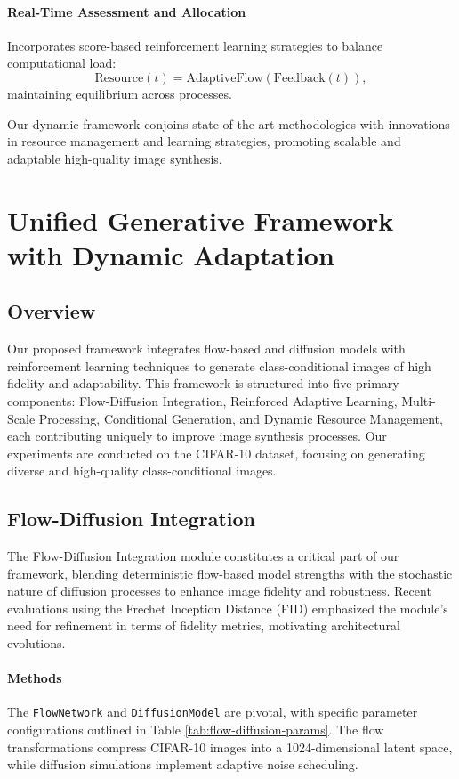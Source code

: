 \documentclass{article} %
\begin{document}
\paragraph{Real-Time Assessment and Allocation}
Incorporates score-based reinforcement learning strategies to balance computational load:
\begin{equation}
\text{Resource}(t) = \text{AdaptiveFlow}(\text{Feedback}(t)),
\end{equation}
maintaining equilibrium across processes.

Our dynamic framework conjoins state-of-the-art methodologies with innovations in resource management and learning strategies, promoting scalable and adaptable high-quality image synthesis.


\section{Unified Generative Framework with Dynamic Adaptation}

\subsection{Overview}

Our proposed framework integrates flow-based and diffusion models with reinforcement learning techniques to generate class-conditional images of high fidelity and adaptability. This framework is structured into five primary components: Flow-Diffusion Integration, Reinforced Adaptive Learning, Multi-Scale Processing, Conditional Generation, and Dynamic Resource Management, each contributing uniquely to improve image synthesis processes. Our experiments are conducted on the CIFAR-10 dataset, focusing on generating diverse and high-quality class-conditional images.

\subsection{Flow-Diffusion Integration}

The Flow-Diffusion Integration module constitutes a critical part of our framework, blending deterministic flow-based model strengths with the stochastic nature of diffusion processes to enhance image fidelity and robustness. Recent evaluations using the Frechet Inception Distance (FID) emphasized the module's need for refinement in terms of fidelity metrics, motivating architectural evolutions.

\paragraph{Methods}
The \texttt{FlowNetwork} and \texttt{DiffusionModel} are pivotal, with specific parameter configurations outlined in Table \ref{tab:flow-diffusion-params}. The flow transformations compress CIFAR-10 images into a 1024-dimensional latent space, while diffusion simulations implement adaptive noise scheduling.
\end{document}
